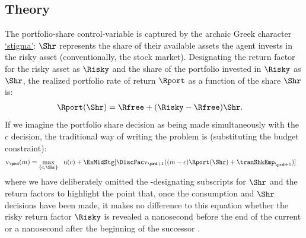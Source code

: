 \documentclass[titlepage, headings=optiontotocandhead]{econtex}
\begin{document}
\subsection{Theory}\label{subsec:MCTheory}

The portfolio-share control-variable is captured by the archaic Greek character \href{https://en.wikipedia.org/wiki/Stigma_(ligature)}{`stigma'}:  $\Shr$ represents the share of their available assets the agent invests in the risky asset (conventionally, the stock market).  Designating the return factor for the risky asset as $\Risky$ and the share of the portfolio invested in $\Risky$ as $\Shr$, the realized portfolio rate of return $\Rport$ as a function of the share $\Shr$ is:
\begin{equation}\begin{gathered}\begin{aligned}
      \Rport(\Shr) &= \Rfree+(\Risky-\Rfree)\Shr \label{eq:Shr}.
    \end{aligned}\end{gathered}\end{equation}
If we imagine the portfolio share decision as being made simultaneously with the $c$ decision, the traditional way of writing the problem is (substituting the budget constraint):
\begin{equation}\begin{gathered}\begin{aligned}
      \mathrm{v}_{\prd}(m)  & = \max_{\{\mathrm{c},\Shr\}} ~~  \mathrm{u}(c) + \ExMidStg[\DiscFac \mathrm{v}_{\prd+1}((m-c)\Rport(\Shr) + {\tranShkEmp}_{\prd+1})] \label{eq:Bellmanundated}
    \end{aligned}\end{gathered}\end{equation}
where we have deliberately omitted the {\interval}-designating subscripts for $\Shr$ and the return factors to highlight the point that, once the consumption and $\Shr$ decisions have been made, it makes no difference to this equation whether the risky return factor $\Risky$ is revealed a nanosecond before the end of the current {\interval} or a nanosecond after the beginning of the successor {\interval}.
\end{document}

